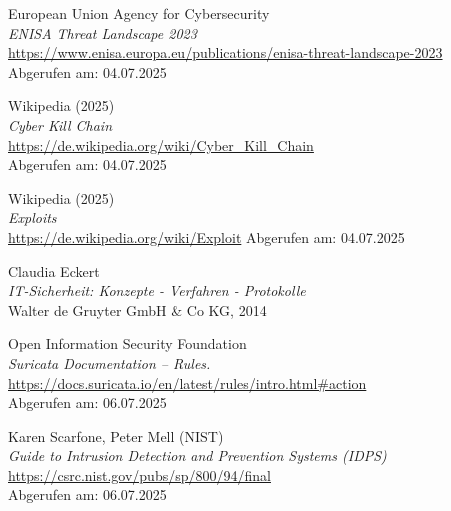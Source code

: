 \documentclass[12pt]{scrreprt}
\begin{document}
\begin{thebibliography}{99}
European Union Agency for Cybersecurity\\
\emph{ENISA Threat Landscape 2023} \\
\url{https://www.enisa.europa.eu/publications/enisa-threat-landscape-2023}\\
Abgerufen am: 04.07.2025

Wikipedia (2025)\\
\emph{Cyber Kill Chain} \\
\url{https://de.wikipedia.org/wiki/Cyber_Kill_Chain}\\
Abgerufen am: 04.07.2025

Wikipedia (2025)\\
\emph{Exploits} \\
\url{https://de.wikipedia.org/wiki/Exploit}
Abgerufen am: 04.07.2025

Claudia Eckert\\
\emph{IT-Sicherheit: Konzepte - Verfahren - Protokolle} \\
Walter de Gruyter GmbH \& Co KG, 2014

Open Information Security Foundation\\
\emph{Suricata Documentation – Rules.} \\
\url{https://docs.suricata.io/en/latest/rules/intro.html#action}\\
Abgerufen am: 06.07.2025

Karen Scarfone, Peter Mell (NIST)\\
\emph{Guide to Intrusion Detection and Prevention Systems (IDPS)} \\
\url{https://csrc.nist.gov/pubs/sp/800/94/final}\\
Abgerufen am: 06.07.2025
	\end{thebibliography}
	\newpage
	
\end{document}
